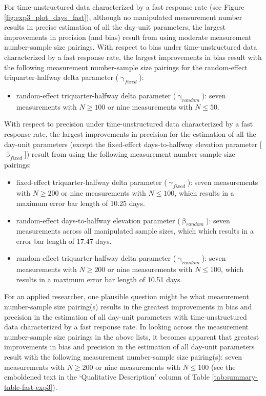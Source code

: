 \documentclass[
12pt, %
twoside,
english]{guelphthesis}
\begin{document}
For time-unstructured data characterized by a fast response rate (see Figure \ref{fig:exp3_plot_days_fast}), although no manipulated measurement number results in precise estimation of all the day-unit parameters, the largest improvements in precision (and bias) result from using moderate measurement number-sample size pairings. With respect to bias under time-unstructured data characterized by a fast response rate, the largest improvements in bias result with the following measurement number-sample size pairings for the random-effect triquarter-halfway delta parameter (\(\upgamma_{fixed}\)):
\begin{itemize}
\tightlist
\item
  random-effect triquarter-halfway delta parameter (\(\upgamma_{random}\)): seven measurements with \(N \ge 100\) or nine measurements with \(N \le 50\).
\end{itemize}
\noindent With respect to precision under time-unstructured data characterized by a fast response rate, the largest improvements in precision for the estimation of all the day-unit parameters (except the fixed-effect days-to-halfway elevation parameter {[}\(\upbeta_{fixed}\){]}) result from using the following measurement number-sample size pairings:
\begin{itemize}
\tightlist
\item
  fixed-effect triquarter-halfway delta parameter (\(\upgamma_{fixed}\)): seven measurements with \(N \ge 200\) or nine measurements with \(N \le 100\), which results in a maximum error bar length of 10.25 days.
\item
  random-effect days-to-halfway elevation parameter (\(\upbeta_{random}\)): seven measurements across all manipulated sample sizes, which which results in a error bar length of 17.47 days.
\item
  random-effect triquarter-halfway delta parameter (\(\upgamma_{random}\)): seven measurements with \(N \ge 200\) or nine measurements with \(N \le 100\), which results in a maximum error bar length of 10.51 days.
\end{itemize}
For an applied researcher, one plausible question might be what measurement number-sample size pairing(s) results in the greatest improvements in bias and precision in the estimation of all day-unit parameters with time-unstructured data characterized by a fast response rate. In looking across the measurement number-sample size pairings in the above lists, it becomes apparent that greatest improvements in bias and precision in the estimation of all day-unit parameters result with the following measurement number-sample size pairing(s): seven measurements with \(N \ge 200\) or nine measurements with \(N \le 100\) (see the emboldened text in the `Qualitative Description' column of Table \ref{tab:summary-table-fast-exp3}).
\end{document}
